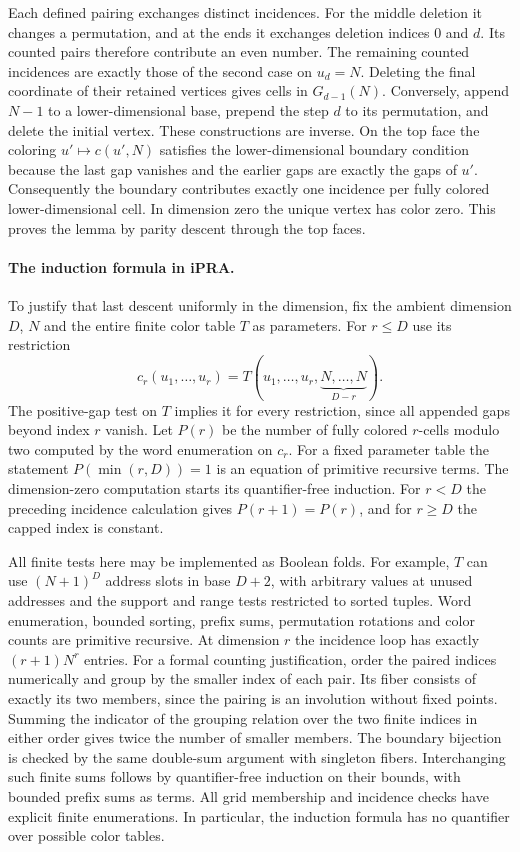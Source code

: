 Each defined pairing exchanges distinct incidences. For the middle
deletion it changes a permutation, and at the ends it exchanges
deletion indices $0$ and $d$. Its counted pairs therefore contribute an
even number. The remaining counted incidences are exactly those of the
second case on $u_d=N$. Deleting the final coordinate of their retained
vertices gives cells in $G_{d-1}(N)$. Conversely, append $N-1$ to a
lower-dimensional base, prepend the step $d$ to its permutation, and
delete the initial vertex. These constructions are inverse. On the
top face the coloring $u'\mapsto c(u',N)$ satisfies the lower-dimensional
boundary condition because the last gap vanishes and the earlier gaps
are exactly the gaps of $u'$. Consequently the boundary contributes
exactly one incidence per fully colored lower-dimensional cell.
In dimension zero the unique vertex has color zero. This proves the
lemma by parity descent through the top faces.

\paragraph{The induction formula in iPRA.}
To justify that last descent uniformly in the dimension, fix the
ambient dimension $D$, $N$ and the entire finite color table $T$ as
parameters. For $r\leq D$ use its restriction
\[
 c_r(u_1,\ldots,u_r)=T(u_1,\ldots,u_r,
                           \underbrace{N,\ldots,N}_{D-r}).
\]
The positive-gap test on $T$ implies it for every restriction,
since all appended gaps beyond index $r$ vanish. Let $P(r)$ be the
number of fully colored $r$-cells modulo two computed by the word
enumeration on $c_r$. For a fixed parameter table the statement
$P(\min(r,D))=1$ is an equation of primitive recursive terms.
The dimension-zero computation starts its quantifier-free induction.
For $r<D$ the preceding incidence calculation gives
$P(r+1)=P(r)$, and for $r\geq D$ the capped index is constant.

All finite tests here may be implemented as Boolean folds. For example,
$T$ can use $(N+1)^D$ address slots in base $D+2$, with arbitrary
values at unused addresses and the support and range tests restricted
to sorted tuples. Word enumeration, bounded sorting, prefix sums,
permutation rotations and color counts are primitive recursive.
At dimension $r$ the incidence loop has exactly $(r+1)N^r$ entries.
For a formal counting justification, order the paired indices
numerically and group by the smaller index of each pair. Its fiber
consists of exactly its two members, since the pairing is an involution
without fixed points. Summing the indicator of the grouping relation
over the two finite indices in either order gives twice the number of
smaller members. The boundary bijection is checked by the same
double-sum argument with singleton fibers. Interchanging such finite
sums follows by quantifier-free induction on their bounds, with
bounded prefix sums as terms. All grid membership and incidence
checks have explicit finite enumerations. In particular, the induction
formula has no quantifier over possible color tables.

